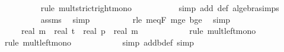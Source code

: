 \begin{isabellebody}
\ \ \ \ \ \ \ \ \isamarkupfalse%
\ {\isacharparenleft}{\kern0pt}rule\ mult{\isacharunderscore}{\kern0pt}strict{\isacharunderscore}{\kern0pt}right{\isacharunderscore}{\kern0pt}mono{\isacharparenright}{\kern0pt}\isanewline
\ \ \ \ \ \ \ \ \ \isamarkupfalse%
\ {\isacharparenleft}{\kern0pt}simp\ add{\isacharcolon}{\kern0pt}\ {\isasymdelta}{\isacharprime}{\kern0pt}{\isacharunderscore}{\kern0pt}def\ algebra{\isacharunderscore}{\kern0pt}simps{\isacharparenright}{\kern0pt}\isanewline
\ \ \ \ \ \ \ \ \isamarkupfalse%
\ assms\ \isamarkupfalse%
\ simp\isanewline
\ \ \ \ \ \ \ \ \isamarkupfalse%
\ r{\isacharunderscore}{\kern0pt}le{\isacharunderscore}{\kern0pt}{\isasymdelta}\ m{\isacharunderscore}{\kern0pt}eq{\isacharunderscore}{\kern0pt}F{\isacharunderscore}{\kern0pt}{}\ m{\isacharunderscore}{\kern0pt}ge{\isacharunderscore}{\kern0pt}{}\ b{\isacharunderscore}{\kern0pt}ge{\isacharunderscore}{\kern0pt}{}\ \isamarkupfalse%
\ simp\isanewline
\ \ \ \ \ \ \isamarkupfalse%
\ \isamarkupfalse%
\ {\isachardoublequoteopen}{\isachardot}{\kern0pt}{\isachardot}{\kern0pt}{\isachardot}{\kern0pt}\ {\isasymle}\ {\isacharparenleft}{\kern0pt}{}{\isacharminus}{\kern0pt}{\isasymdelta}{\isacharprime}{\kern0pt}{\isacharparenright}{\kern0pt}\ {\isacharasterisk}{\kern0pt}\ {\isacharparenleft}{\kern0pt}real\ m\ {\isacharasterisk}{\kern0pt}\ {\isacharparenleft}{\kern0pt}real\ t\ {\isacharasterisk}{\kern0pt}\ real\ p\ {\isacharslash}{\kern0pt}\ {\isacharparenleft}{\kern0pt}real\ m\ {\isacharasterisk}{\kern0pt}\ {\isacharparenleft}{\kern0pt}{}{\isacharminus}{\kern0pt}{\isasymdelta}{\isacharprime}{\kern0pt}{\isacharparenright}{\kern0pt}{\isacharparenright}{\kern0pt}{\isacharparenright}{\kern0pt}{\isacharparenright}{\kern0pt}{\isachardoublequoteclose}\isanewline
\ \ \ \ \ \ \ \ \isamarkupfalse%
\ {\isacharparenleft}{\kern0pt}rule\ mult{\isacharunderscore}{\kern0pt}left{\isacharunderscore}{\kern0pt}mono{\isacharparenright}{\kern0pt}\isanewline
\ \ \ \ \ \ \ \ \isamarkupfalse%
\ {\isacharparenleft}{\kern0pt}rule\ mult{\isacharunderscore}{\kern0pt}left{\isacharunderscore}{\kern0pt}mono{\isacharparenright}{\kern0pt}\isanewline
\ \ \ \ \ \ \ \ \ \ \isamarkupfalse%
\ {\isacharparenleft}{\kern0pt}simp\ add{\isacharcolon}{\kern0pt}b{\isacharunderscore}{\kern0pt}def{\isacharcomma}{\kern0pt}\ simp{\isacharparenright}{\kern0pt}\isanewline
\ \ \ \ \ \ \ \ \isamarkupfalse%

\end{isabellebody}
